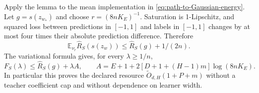 Apply the lemma to the mean implementation in \eqref{eq:path-to-Gaussian-energy}. Let $g=s(z_{w_*})$ and choose $r=(8nK_E)^{-1}$. Saturation is 1-Lipschitz, and squared loss between predictions in $[-1,1]$ and labels in $[-1,1]$ changes by at most four times their absolute prediction difference. Therefore
\[
 \mathbb E_{\nu_r}\widehat R_S(s(z_w))
 \le\widehat R_S(g)+1/(2n).
\]
The variational formula gives, for every $\lambda\ge1/n$,
\begin{equation}
 F_S(\lambda)\le\widehat R_S(g)+\lambda A,
 \qquad
 A=E+1+2[D+1+(H-1)m]\log(8nK_E).
 \label{eq:explicit-selective-cost}
\end{equation}
In particular this proves the declared resource $\widetilde O_{d,H}(1+P+m)$ without a teacher coefficient cap and without dependence on learner width.
